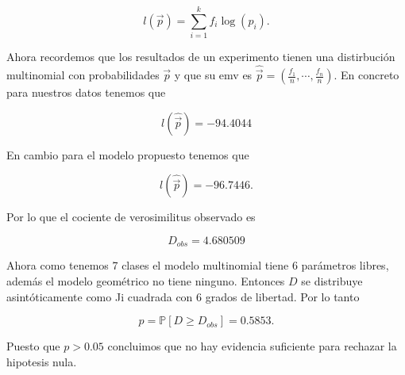 \documentclass[letterpaper]{article}
\theoremstyle{definition}
\theoremstyle{lemathm}
\theoremstyle{lemathm}
\theoremstyle{lemathm}
\theoremstyle{lemademthm}
\newcommand{\pars}[1]{\left( #1 \right) }
\newcommand{\bracs}[1]{\left[ #1 \right] }
\newcommand{\PP}{\mathbb{P}}
\newcommand{\1}{\mathbbm{1}}
\begin{document}
\begin{enumerate}
		\[l(\vec{p}) = \sum_{i=1}^k f_i\log(p_i).\]

		Ahora recordemos que los resultados de un experimento tienen una distirbución multinomial con probabilidades $\vec{p}$ y que su emv es $\hat{\vec{p}} = \pars{\frac{f_1}{n},\cdots,\frac{f_n}{n}}$. En concreto para nuestros datos tenemos que

		\[l(\hat{\vec{p}}) = -94.4044\]

		En cambio para el modelo propuesto tenemos que

		\[l(\hat{\vec{p}}) = -96.7446.\]

		Por lo que el cociente de verosimilitus observado es

		\[D_{obs} = 4.680509\]

		Ahora como tenemos 7 clases el modelo multinomial tiene 6 parámetros libres, además el modelo geométrico no tiene ninguno. Entonces $D$ se distribuye asintóticamente como Ji cuadrada con 6 grados de libertad. Por lo tanto

		\[p = \PP\bracs{D \geq D_{obs}} = 0.5853.\]

		Puesto que $p > 0.05$ concluimos que no hay evidencia suficiente para rechazar la hipotesis nula.

	\end{enumerate}
\end{document}
